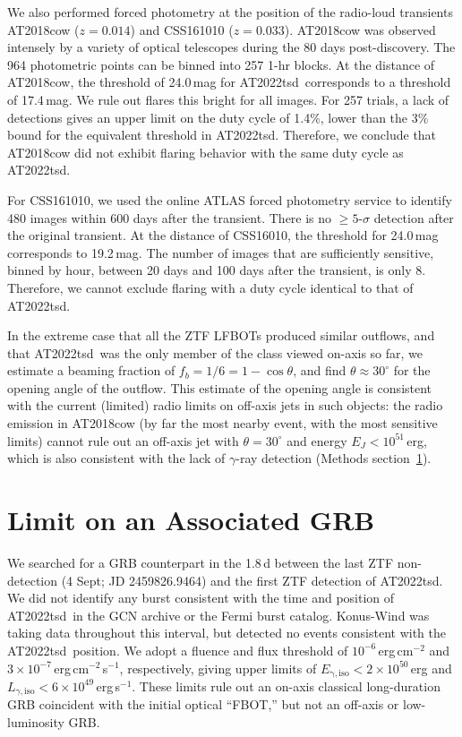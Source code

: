\documentclass{nature_plusfigure}
\newcommand{\at}{AT2022tsd}
\begin{document}
\begin{methods}
We also performed forced photometry at the position of the radio-loud transients AT2018cow\cite{Prentice2018} ($z=0.014$) and CSS161010\cite{Coppejans2020} ($z=0.033$). 
AT2018cow was observed intensely by a variety of optical telescopes during the 80 days post-discovery\cite{Perley2019}. The 964 photometric points can be binned into 257 1-hr blocks. At the distance of AT2018cow, the threshold of 24.0\,mag for \at\ corresponds to a threshold of 17.4\,mag. We rule out flares this bright for all images. For 257 trials, a lack of detections gives an upper limit on the duty cycle of 1.4\%, lower than the 3\% bound for the equivalent threshold in \at. Therefore, we conclude that AT2018cow did not exhibit flaring behavior with the same duty cycle as \at.

For CSS161010, we used the online ATLAS\cite{Tonry2018,Smith2020} forced photometry service\cite{Shingles2021} to identify 480 images within 600 days after the transient. There is no $\geq5$-$\sigma$ detection after the original transient. At the distance of CSS16010, the threshold for 24.0\,mag corresponds to 19.2\,mag. The number of images that are sufficiently sensitive, binned by hour, between 20 days and 100 days after the transient, is only 8. Therefore, we cannot exclude flaring with a duty cycle identical to that of \at.

In the extreme case that all the ZTF LFBOTs produced similar outflows, and that \at\ was the only member of the class viewed on-axis so far, we estimate a beaming fraction of $f_b = 1/6 = 1-\cos{\theta}$, and find $\theta\approx30^{\circ}$ for the opening angle of the outflow. This estimate of the opening angle is consistent with the current (limited) radio limits on off-axis jets in such objects: the radio emission in AT2018cow (by far the most nearby event, with the most sensitive limits) cannot\cite{Margutti2019} rule out an off-axis jet with $\theta=30^{\circ}$ and energy $E_J<10^{51}\,$erg, which is also consistent with the lack of $\gamma$-ray detection (Methods section~\ref{sec:grbsearch}).

\section{Limit on an Associated GRB}
\label{sec:grbsearch}

We searched for a GRB counterpart in the 1.8\,d between the last ZTF non-detection (4 Sept; JD 2459826.9464) and the first ZTF detection of \at. We did not identify any burst consistent with the time and position of \at\ in the GCN archive or the Fermi burst catalog. Konus-Wind was taking data throughout this interval, but detected no events consistent with the \at\ position. We adopt a fluence and flux threshold of $10^{-6}\,$erg\,cm$^{-2}$ and $3\times10^{-7}\,$erg\,cm$^{-2}$\,s$^{-1}$, respectively\cite{Tsvetkova2017},
giving upper limits of $E_\mathrm{\gamma,iso}<2\times10^{50}\,$erg and $L_{\gamma,\mathrm{iso}}<6\times10^{49}\,$erg\,s$^{-1}$.
These limits rule out an on-axis classical long-duration GRB coincident with the initial optical ``FBOT,'' but not an off-axis or low-luminosity GRB\cite{Cano2017}.


\end{methods}
\end{document}
